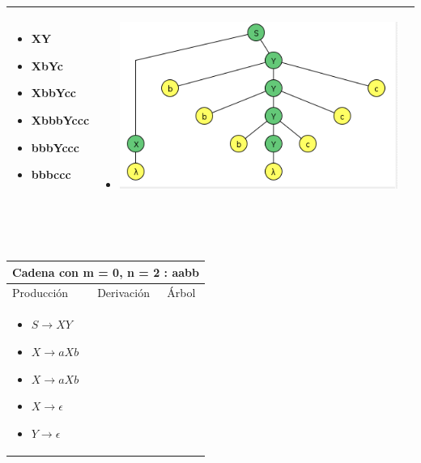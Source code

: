 \documentclass{article}
\begin{document}
\begin{enumerate} [(a)]
\begin{tabular}{|p{3.5cm}|p{3.5cm}|p{8cm}|  }
\begin{itemize}[label={}]
             
         \item	XY 
         \item	XbYc 
         \item	XbbYcc 
         \item	XbbbYccc 
         \item	bbbYccc 
         \item	bbbccc 
         
         
        \end{itemize}
        &
         \begin{itemize}[label={}]
             \item \includegraphics[scale=0.40]{img/2g-bbbccc.png}
        \end{itemize}
        
        \\ \hline
        \end{tabular}
        \\ \\
        \begin{tabular}{|p{3.5cm}|p{3.5cm}|p{8cm}|  }
         \hline
         \multicolumn{3}{|c|}{Cadena con m = 0, n = 2 : aabb} \\
         \hline
         Producción & Derivación & Árbol\\
         \hline
         \begin{itemize}[label={}]
             
             
         \item $ S \to XY$	
         \item $ X \to aXb$	
         \item $ X \to aXb$	
         \item $ X \to \epsilon$
         \item $ Y \to \epsilon$
         
         
        \end{itemize}
        &
        \begin{itemize}[label={}]
             

\end{itemize}
\end{tabular}
\end{enumerate}
\end{document}
